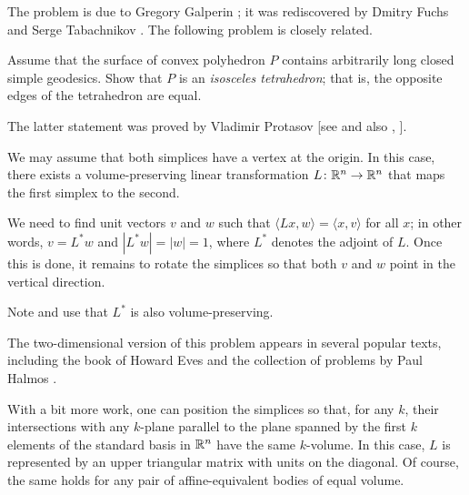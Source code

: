 The problem is due to Gregory Galperin \cite{galperin};
it was rediscovered by Dmitry Fuchs and Serge Tabachnikov \cite[see 20.8 in][]{fuchs-tabachnikov}.
The following problem is closely related.

\begin{pr}
Assume that the surface of convex polyhedron $P$ contains arbitrarily long closed simple geodesics.
Show that $P$ is an \emph{isosceles tetrahedron};
that is, the opposite edges of the tetrahedron are equal.
\end{pr}

The latter statement was proved by Vladimir Protasov [see  and also , ].


We may assume that both simplices have a vertex at the origin.
In this case, there exists a volume-preserving linear transformation $L\colon\mathbb{R}^n \to \mathbb{R}^n$ that maps the first simplex to the second.

We need to find unit vectors $v$ and $w$ such that $\langle Lx, w \rangle = \langle x, v \rangle$ for all $x$;
in other words, $v = L^*w$ and $|L^*w| = |w| = 1$, where $L^*$ denotes the adjoint of $L$.
Once this is done, it remains to rotate the simplices so that both $v$ and $w$ point in the vertical direction.

Note and use that $L^*$ is also volume-preserving.
\qeds

The two-dimensional version of this problem appears in several popular texts, including
the book of Howard Eves \cite[Lecture 19]{eves1981} and
the collection of problems by Paul Halmos \cite[5J]{halmos}.

With a bit more work, one can position the simplices so that, for any $k$, their intersections with any $k$-plane parallel to the plane spanned by the first $k$ elements of the standard basis in $\mathbb{R}^n$ have the same $k$-volume.
In this case, $L$ is represented by an upper triangular matrix with units on the diagonal.
Of course, the same holds for any pair of affine-equivalent bodies of equal volume.

